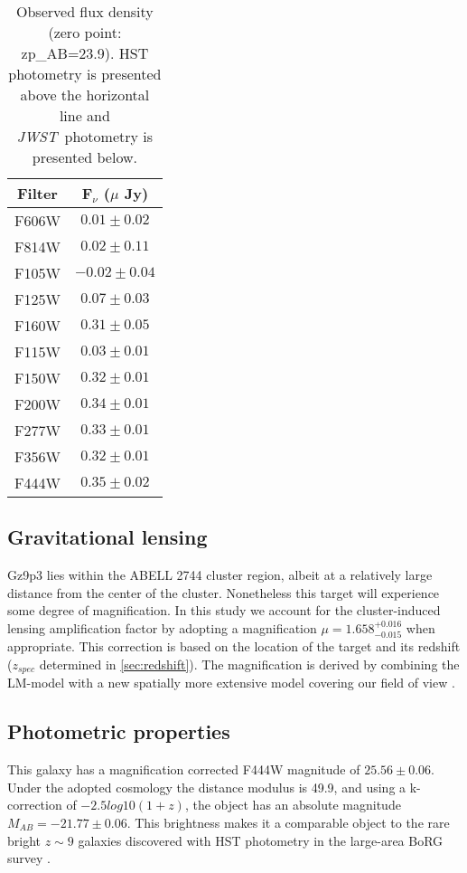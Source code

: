 \documentclass[sn-mathphys]{sn-jnl}%
\theoremstyle{thmstyleone}%
\theoremstyle{thmstyletwo}%
\theoremstyle{thmstylethree}%
\newcommand{\jwst}{\textit{JWST}}
\begin{document}
\begin{table}
\centering
{%
\begin{tabular}{cc}
Filter & F$_{\nu}$ ($\mu$ Jy)\\ \hline \hline
F606W      & $0.01\pm0.02$  \\
F814W       & $0.02\pm0.11$  \\
F105W     & $-0.02\pm0.04$ \\
F125W      & $0.07\pm0.03$  \\
F160W       & $0.31\pm0.05$  \\ \hline 
F115W       & $0.03\pm0.01$   \\
F150W       & $0.32\pm0.01$   \\
F200W       & $0.34\pm0.01$   \\
F277W       & $0.33\pm0.01$  \\
F356W       & $0.32\pm0.01$  \\
F444W      & $0.35\pm0.02$ \\ 
\end{tabular}%
}
\caption{Observed flux density (zero point: zp\_AB=23.9). HST photometry is presented above the horizontal line and \jwst\ photometry is presented below.}
\label{tab:photometry}
\end{table}

\subsection{Gravitational lensing}\label{sec:lensing}
Gz9p3 lies within the ABELL 2744 cluster region, albeit at a relatively large distance from the center of the cluster. Nonetheless this target will experience some degree of magnification. 
In this study we account  for the cluster-induced lensing amplification factor by adopting a magnification $\mu=1.658^{+0.016}_{-0.015}$ when appropriate. This correction is 
based on the location of the target and its redshift ($z_{spec}$ determined in \ref{sec:redshift}). The magnification is derived by combining the LM-model \citep{Bergamini2022} with a new spatially more extensive model covering our field of view \citep{Castellano22b}. 


\subsection{Photometric properties}

This galaxy has a magnification corrected F444W magnitude of \textbf{$25.56\pm0.06$}. Under the adopted cosmology the distance modulus is 49.9, and using a k-correction of $-2.5log10(1+z)$, the object has an absolute magnitude $M_{AB}=-21.77\pm0.06$. This brightness makes it a comparable object to the rare bright $z\sim9$ galaxies discovered with HST photometry in the large-area BoRG survey \citep[e.g.,][]{Leethochawalit22}.
\end{document}
